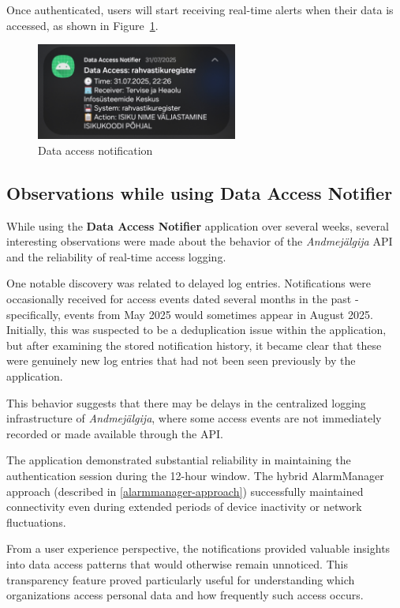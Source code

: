 Once authenticated, users will start receiving real-time alerts when their data is accessed, as shown in Figure~\ref{fig:data-access-notification}.

\begin{figure}[H]
\centering
\includegraphics[width=250px]{english/figures/Screenshot_20250801_133754_Signal.jpg}
\caption{Data access notification}
\label{fig:data-access-notification}
\end{figure}

\subsection{Observations while using \textbf{Data Access Notifier}}
\label{observations}

While using the \textbf{Data Access Notifier} application over several weeks, several interesting observations were made about the behavior of the \textit{Andmejälgija} API and the reliability of real-time access logging.

One notable discovery was related to delayed log entries. Notifications were occasionally received for access events dated several months in the past - specifically, events from May 2025 would sometimes appear in August 2025. Initially, this was suspected to be a deduplication issue within the application, but after examining the stored notification history, it became clear that these were genuinely new log entries that had not been seen previously by the application.

This behavior suggests that there may be delays in the centralized logging infrastructure of \textit{Andmejälgija}, where some access events are not immediately recorded or made available through the API.

The application demonstrated substantial reliability in maintaining the authentication session during the 12-hour window. The hybrid AlarmManager approach (described in \ref{alarmmanager-approach}) successfully maintained connectivity even during extended periods of device inactivity or network fluctuations.

From a user experience perspective, the notifications provided valuable insights into data access patterns that would otherwise remain unnoticed. This transparency feature proved particularly useful for understanding which organizations access personal data and how frequently such access occurs.

